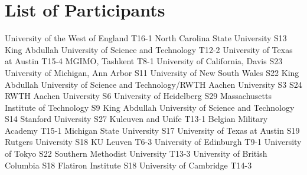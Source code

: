 \chapter{List of Participants}
\setlength{\columnsep}{1cm}
\begin{multicols}{2}
\small\raggedright
{}
{University of the West of England}
{T16-1}
{}
{}
{}
{}
{}
{}
{North Carolina State University}
{S13}
{}
{}
{}
{}
{}
{}
{King Abdullah University of Science and Technology}
{T12-2}
{}
{}
{}
{}
{}
{}
{University of Texas at Austin}
{T15-4}
{}
{}
{}
{}
{}
{}
{MGIMO, Tashkent}
{T8-1}
{}
{}
{}
{}
{}
{}
{University of California, Davis}
{S23}
{}
{}
{}
{}
{}
{}
{University of Michigan, Ann Arbor}
{S11}
{}
{}
{}
{}
{}
{}
{University of New South Wales}
{S22}
{}
{}
{}
{}
{}
{}
{King Abdullah University of Science and Technology/RWTH Aachen University}
{S3}
{S24}
{}
{}
{}
{}
{}
{RWTH Aachen University}
{S6}
{}
{}
{}
{}
{}
{}
{University of Heidelberg}
{S29}
{}
{}
{}
{}
{}
{}
{Massachusetts Institute of Technology}
{S9}
{}
{}
{}
{}
{}
{}
{King Abdullah University of Science and Technology}
{S14}
{}
{}
{}
{}
{}
{}
{Stanford University}
{S27}
{}
{}
{}
{}
{}
{}
{Kuleuven and Unife}
{T13-1}
{}
{}
{}
{}
{}
{}
{Belgian Military Academy}
{T15-1}
{}
{}
{}
{}
{}
{}
{Michigan State University}
{S17}
{}
{}
{}
{}
{}
{}
{University of Texas at Austin}
{S19}
{}
{}
{}
{}
{}
{}
{Rutgers University}
{S18}
{}
{}
{}
{}
{}
{}
{KU Leuven}
{T6-3}
{}
{}
{}
{}
{}
{}
{University of Edinburgh}
{T9-1}
{}
{}
{}
{}
{}
{}
{University of Tokyo}
{S22}
{}
{}
{}
{}
{}
{}
{Southern Methodist University}
{T13-3}
{}
{}
{}
{}
{}
{}
{University of British Columbia}
{S18}
{}
{}
{}
{}
{}
{}
{Flatiron Institute}
{S18}
{}
{}
{}
{}
{}
{}
{University of Cambridge}
{T14-3}
{}
{}
{}
{}
{}
{}

\end{multicols}

